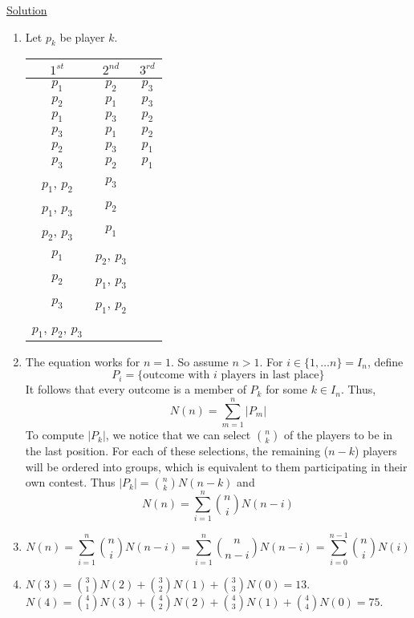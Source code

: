 \begin{enumerate}
\underline{Solution}

\begin{enumerate}
\item Let $p_k$ be player $k$.

\begin{tabular}{|c|c|c|} 
\hline
$1^{st}$ & $2^{nd}$ & $3^{rd}$ \\
\hline
$p_1$ & $p_2$ & $p_3$ \\
\hline
$p_2$ & $p_1$ & $p_3$ \\
\hline
$p_1$ & $p_3$ & $p_2$ \\
\hline
$p_3$ & $p_1$ & $p_2$ \\
\hline
$p_2$ & $p_3$ & $p_1$ \\
\hline
$p_3$ & $p_2$ & $p_1$ \\
\hline
$p_1$, $p_2$ & $p_3$ \\ \cline{1-2}
$p_1$, $p_3$ & $p_2$ \\ \cline{1-2}
$p_2$, $p_3$ & $p_1$ \\ \cline{1-2}
$p_1$ & $p_2$, $p_3$ \\ \cline{1-2}
$p_2$ & $p_1$, $p_3$ \\ \cline{1-2}
$p_3$ & $p_1$, $p_2$ \\ \cline{1-2}
$p_1$, $p_2$, $p_3$ \\ \cline{1-1}
\end{tabular} 

\item The equation works for $n = 1$. So assume $n > 1$. For
$i \in \{1, \ldots n\} = I_n$, define
\[P_i = \{\mbox{outcome with } i \mbox{ players in last place}\}\]
It follows that every outcome is a member of $P_k$ for some $k \in I_n$. Thus,
\[N(n) = \sum_{m=1}^n|P_m|\]
To compute $|P_k|$, we notice that we can select $\binom{n}{k}$ of the players
to be in the last position. For each of these selections, the remaining
($n-k$) players will be ordered into groups, which is equivalent to them
participating in their own contest. Thus $|P_k| = \binom{n}{k}N(n-k)$ and
\[N(n) = \sum_{i=1}^n\binom{n}{i}N(n - i)\]

\item \[N(n) = \sum_{i=1}^n\binom{n}{i}N(n - i) =
\sum_{i=1}^n\binom{n}{n-i}N(n - i) = \sum_{i=0}^{n-1}\binom{n}{i}N(i)\]
\item $N(3) = \binom{3}{1}N(2) + \binom{3}{2}N(1) + \binom{3}{3}N(0) = 13$. \\
$N(4) = \binom{4}{1}N(3) + \binom{4}{2}N(2) + \binom{4}{3}N(1) +
\binom{4}{4}N(0) = 75$.

\end{enumerate}


\end{enumerate}
